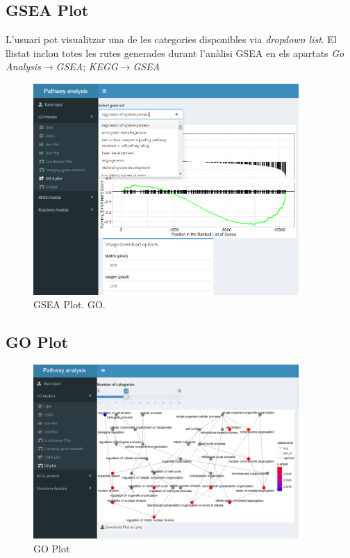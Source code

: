 \subsection{GSEA Plot}
L'usuari pot visualitzar una de les categories disponibles via \textit{dropdown list}. El llistat inclou totes les rutes generades durant l'anàlisi GSEA en els apartats \textit{Go Analysis}$\rightarrow$\textit{GSEA}; \textit{KEGG}$\rightarrow$\textit{GSEA}
\begin{figure}[H]
\centering
\includegraphics[width=0.9\textwidth]{figures/App_F18_Items_GO_GSEA_Plot.png} 
\caption{GSEA Plot. GO.}
\end{figure}


\subsection{GO Plot}

\begin{figure}[H]
\centering
\includegraphics[width=0.9\textwidth]{figures/App_F19_Items_GO_GOPlot.png} 
\caption{GO Plot}
\end{figure}

